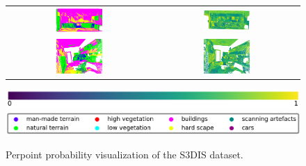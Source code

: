 \begin{figure}[h!]
\begin{tabular}{cc}
            \includegraphics[width=0.33\textwidth, height=0.18\textheight]{images/seg_output/s3dis_DE/S3DIS_3_Pred.pdf}& 
            \includegraphics[width=0.33\textwidth, height=0.18\textheight]{images/seg_output/s3dis_DE/S3DIS_3_prob.pdf}\\

            \includegraphics[width=0.33\textwidth, height=0.18\textheight]{images/seg_output/s3dis_DE/S3DIS_4_Pred.pdf}& 
            \includegraphics[width=0.33\textwidth, height=0.18\textheight]{images/seg_output/s3dis_DE/S3DIS_4_prob.pdf}\\
        \end{tabular}
        \includegraphics[scale=0.45]{images/prob_legend.pdf}
        \includegraphics[scale=0.45]{images/legend.png}
        \caption{Perpoint probability visualization of the S3DIS dataset.}
        \label{fig:de_s3dis_probmap}
    \end{figure}


